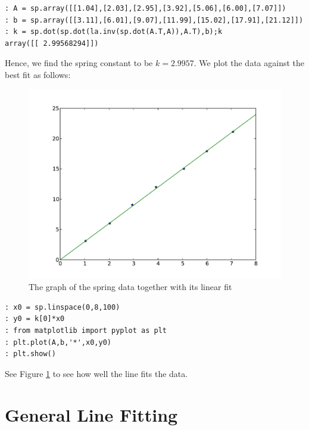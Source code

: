 \begin{lstlisting}[style=python]
: A = sp.array([[1.04],[2.03],[2.95],[3.92],[5.06],[6.00],[7.07]])
: b = sp.array([[3.11],[6.01],[9.07],[11.99],[15.02],[17.91],[21.12]])
: k = sp.dot(sp.dot(la.inv(sp.dot(A.T,A)),A.T),b);k
array([[ 2.99568294]])
\end{lstlisting}
Hence, we find the spring constant to be $k = 2.9957$.  We plot the data against the best fit as follows:
\begin{figure}[h!]
\label{fig1}
\begin{center}
\includegraphics[scale = .6]{lab9_line_py}
\caption{The graph of the spring data together with its linear fit}
\label{Fig:SpringFit}
\end{center}
\end{figure}

\begin{lstlisting}[style=python]
: x0 = sp.linspace(0,8,100)
: y0 = k[0]*x0
: from matplotlib import pyplot as plt
: plt.plot(A,b,'*',x0,y0)
: plt.show()
\end{lstlisting}
See Figure \ref{Fig:SpringFit} to see how well the line fits the data.


\section*{General Line Fitting}

